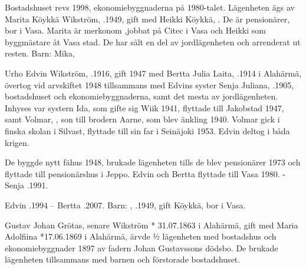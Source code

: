 
Bostadshuset revs 1998,  ekonomiebyggnaderna på 1980-talet. Lägenheten ägs av Marita Köykkä Wikström, .1949, gift med Heikki Köykkä, . De är pensionärer, bor i Vasa. Marita är merkonom ,jobbat på Citec i Vasa och Heikki som byggmästare åt Vasa stad. De har sålt en del av jordlägenheten och arrenderat ut resten.
Barn: Mika, 


Urho Edvin Wikström, .1916, gift 1947 med Bertta Julia Laita, .1914 i Alahärmä, övertog vid arvskiftet 1948 tillsammans med Edvins syster Senja Juliana, .1905, bostadshuset och ekonomiebyggnaderna, samt det mesta av jordlägenheten. Inhyses var systern Ida, som gifte sig Wiik 1941, flyttade till Jakobstad 1947, samt Volmar, ,  son till brodern Aarne, som blev änkling 1940. Volmar gick i finska skolan i Silvast, flyttade till sin far i Seinäjoki 1953. Edvin deltog i båda krigen.

De byggde nytt fähus 1948, brukade lägenheten tills de blev pensionärer 1973 och flyttade till pensionärshus i Jeppo.  Edvin och Bertta flyttade till Vasa 1980. - Senja .1991.

Edvin .1994  --  Bertta .2007.
Barn: , .1949, gift Köykkä, bor i Vasa.


Gustav Johan Grötas, senare Wikström * 31.07.1863 i Alahärmä, gift med Maria Adolfiina *17.06.1869 i Alahärmä, ärvde ½ lägenheten med bostadshus och ekonomiebyggnader 1897 av fadern Johan Gustavssons dödsbo. De brukade lägenheten  tillsammans med barnen och förstorade bostadshuset.

